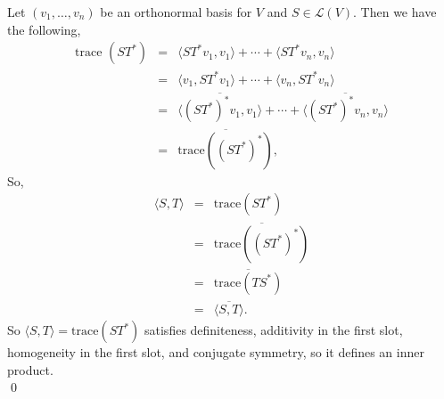 \documentclass[12pt]{article}
\begin{document}
\noindent
Let $(v_1, \ldots, v_n)$ be an orthonormal basis for $V$ and $S \in \mathcal{L}(V)$. Then we have the following,
\begin{eqnarray*}
\text{trace }(ST^*) &=& \langle ST^*v_1, v_1 \rangle + \cdots + \langle ST^*v_n, v_n \rangle\\
&=& \langle v_1, ST^*v_1 \rangle + \cdots + \langle v_n, ST^*v_n \rangle\\
&=& \overline{\langle (ST^*)^*v_1, v_1 \rangle} + \cdots +\overline{\langle (ST^*)^*v_n, v_n \rangle}\\
&=& \overline{\text{trace}((ST^*)^*)},
\end{eqnarray*}
So,
\begin{eqnarray*}
\langle S, T \rangle &=& \text{trace}(ST^*)\\
&=& \overline{\text{trace}((ST^*)^*)}\\
&=& \overline{\text{trace}(TS^*)}\\
&=& \overline{\langle S, T \rangle}.
\end{eqnarray*}
So $\langle S, T \rangle = \text{trace}(ST^*)$ satisfies definiteness, additivity in the first slot, homogeneity in the first slot, and conjugate symmetry, so it defines an inner product.\\
\qed
\end{document}
